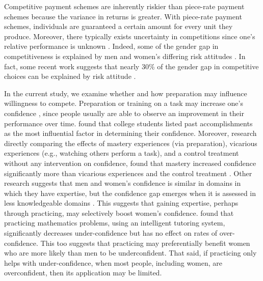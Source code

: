 \documentclass[a4paper, nobind]{templates/ociamthesis}
\begin{document}
Competitive payment schemes are inherently riskier than piece-rate payment schemes because the variance in returns is greater. With piece-rate payment schemes, individuals are guaranteed a certain amount for every unit they produce. Moreover, there typically exists uncertainty in competitions since one's relative performance is unknown \autocite{Niederle2011}. Indeed, some of the gender gap in competitiveness is explained by men and women's differing risk attitudes \autocite{Niederle2011}. In fact, some recent work suggests that nearly 30\% of the gender gap in competitive choices can be explained by risk attitude \autocite{Gillen2019,Veldhuizen2017}.

In the current study, we examine whether and how preparation may influence willingness to compete. Preparation or training on a task may increase one's confidence \autocite{Gist1992,Schunk1981,Schunk1982,Usher2008}, since people usually are able to observe an improvement in their performance over time. \textcite{Lent1996} found that college students listed past accomplishments as the most influential factor in determining their confidence. Moreover, research directly comparing the effects of mastery experiences (via preparation), vicarious experiences (e.g., watching others perform a task), and a control treatment without any intervention on confidence, found that mastery increased confidence significantly more than vicarious experiences and the control treatment \autocite{Bandura1977a}. Other research suggests that men and women's confidence is similar in domains in which they have expertise, but the confidence gap emerges when it is assessed in less knowledgeable domains \autocite{Sarsons2016}. This suggests that gaining expertise, perhaps through practicing, may selectively boost women's confidence. \textcite{Roll2011} found that practicing mathematics problems, using an intelligent tutoring system, significantly decreases under-confidence but has no effect on rates of over-confidence. This too suggests that practicing may preferentially benefit women who are more likely than men to be underconfident. That said, if practicing only helps with under-confidence, when most people, including women, are overconfident, then its application may be limited.
\end{document}
